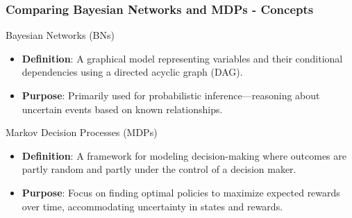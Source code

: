\documentclass[aspectratio=169]{beamer}
\begin{document}
\begin{frame}[fragile]
    \frametitle{Comparing Bayesian Networks and MDPs - Concepts}
    \begin{block}{Bayesian Networks (BNs)}
        \begin{itemize}
            \item \textbf{Definition}: A graphical model representing variables and their conditional dependencies using a directed acyclic graph (DAG).
            \item \textbf{Purpose}: Primarily used for probabilistic inference—reasoning about uncertain events based on known relationships.
        \end{itemize}
    \end{block}
    
    \begin{block}{Markov Decision Processes (MDPs)}
        \begin{itemize}
            \item \textbf{Definition}: A framework for modeling decision-making where outcomes are partly random and partly under the control of a decision maker.
            \item \textbf{Purpose}: Focus on finding optimal policies to maximize expected rewards over time, accommodating uncertainty in states and rewards.
        \end{itemize}
    \end{block}
\end{frame}
\end{document}
